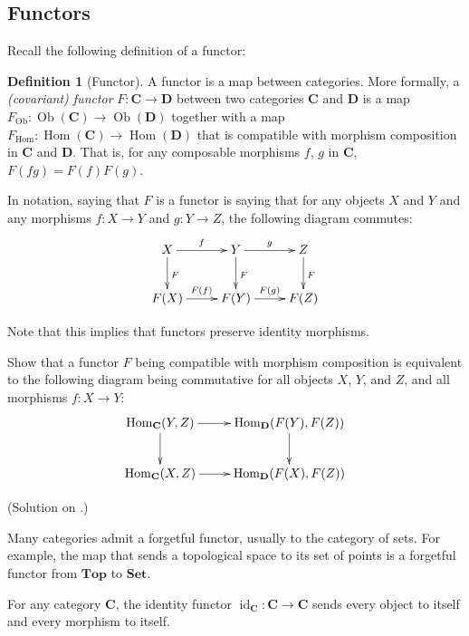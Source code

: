 \documentclass{amsart}
\theoremstyle{definition} \newaliasedtheorem{defn}[thm]{Definition}
\theoremstyle{definition} \newtheorem*{defn*}{Definition}
\theoremstyle{definition} \newaliasedtheorem{xca}[thm]{Exercise}
\theoremstyle{definition} \newtheorem*{soln*}{Solution}
\theoremstyle{definition} \newaliasedtheorem{remark}[thm]{Remark}
\theoremstyle{definition} \newtheorem*{remark*}{Remark}
\newcommand{\defnref}[2][]{%
  \ifempty{#1}{%
    \hyperref[defn:#2]{#2}%
  }{%
    \hyperref[defn:#1]{#2}%
  }%
}
\newcommand{\cat}[1]{\ensuremath{\mathbf{#1}}}
\DeclareMathOperator{\Ob}{Ob}
\DeclareMathOperator{\id}{id}
\DeclareMathOperator{\Hom}{Hom}
\begin{document}
  \subsection{Functors} \label{sec:more-functors}
    Recall the following definition of a functor:
    \begin{defn*}[Functor]
      A functor is a map between categories.  More formally, a \emph{(covariant) functor} $F : \cat C \to \cat D$ between two categories $\cat C$ and $\cat D$ is a map $F_{\Ob} : \Ob(\cat C) \to \Ob(\cat D)$ together with a map $F_{\Hom} : \Hom(\cat C) \to \Hom(\cat D)$ that is compatible with morphism composition in \cat C and \cat D.  That is, for any composable morphisms $f$, $g$ in $\cat C$, $F(fg) = F(f) F(g)$.
    \end{defn*}
    
    In \defnref{diagram} notation, saying that $F$ is a functor is saying that for any objects $X$ and $Y$ and any morphisms $f: X \to Y$ and $g: Y \to Z$, the following diagram commutes:
    \[
    \xymatrix{
      X \ar[r]^f \ar[d]^F & Y \ar[r]^g \ar[d]^F & Z \ar[d]^F \\
      F(X) \ar[r]^{F(f)} & F(Y) \ar[r]^{F(g)} & F(Z)
    }
    \]
    
    Note that this implies that functors preserve identity morphisms.
    
    \begin{xca} \label{xca:functor_commutative_diagram}
      Show that a functor $F$ being compatible with morphism composition is equivalent to the following diagram being commutative for all objects $X$, $Y$, and $Z$, and all morphisms $f: X \to Y$:
      \[
        \xymatrix{
          \Hom_{\cat C}(Y, Z) \ar[r] \ar[d] & \Hom_{\cat D}(F(Y), F(Z)) \ar[d] \\
          \Hom_{\cat C}(X, Z) \ar[r] & \Hom_{\cat D}(F(X), F(Z))
        }
      \]
      
      (Solution on .)
    \end{xca}
    
    \begin{example}
      Many categories admit a forgetful functor, usually to the category of sets.  For example, the map that sends a topological space to its set of points is a forgetful functor from \cat{Top} to \cat{Set}.
    \end{example}
    
    \begin{example}
      For any category $\cat C$, the identity functor $\id_{\cat C}: \cat C \to \cat C$ sends every object to itself and every morphism to itself.
    \end{example}
    
\end{document}
